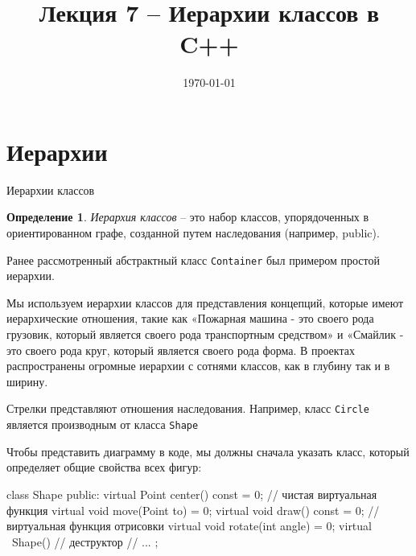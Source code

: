 \documentclass[
    8pt,
    hyperref={pdfencoding=unicode}
    ]{beamer}
\title{Лекция 7 – Иерархии классов в C++}
\institute{Кафедра прикладной математики и информатики}
\date{\today}
\theoremstyle{definition}
\newtheorem{myDef}{Определение}
\begin{document}
\titlepage 
\section{Иерархии}

\begin{frame}{Иерархии классов}
    \begin{myDef}
       \emph{Иерархия классов} -- это набор классов, упорядоченных в ориентированном графе, 
       созданной путем наследования (например, public).
    \end{myDef}
    Ранее рассмотренный абстрактный класс \texttt{Container} был примером простой иерархии.
    
    \vspace{2em}
    
    Мы используем иерархии классов для представления концепций, которые имеют иерархические отношения, такие как «Пожарная машина - это 
    своего рода грузовик, который является своего рода транспортным средством» и «Смайлик - это своего рода круг, который является своего 
    рода форма. В проектах распространены огромные иерархии с сотнями классов, как в глубину так и в ширину.
    
    \begin{figure}
    \end{figure}
    Стрелки представляют отношения наследования. 
    Например, класс \texttt{Circle} является производным от класса \texttt{Shape}
    
    Чтобы представить диаграмму в коде, мы должны сначала указать класс, который определяет общие свойства всех фигур:
    \begin{cppcode}
        class Shape {
            public:
            virtual Point center() const = 0; // чистая виртуальная функция
            virtual void move(Point to) = 0;
            virtual void draw() const = 0;    // виртуальная функция отрисовки
            virtual void rotate(int angle) = 0;
            virtual ~Shape() {}	// деструктор
            // ...
        };
    \end{cppcode}
    

\end{frame}
\end{document}
